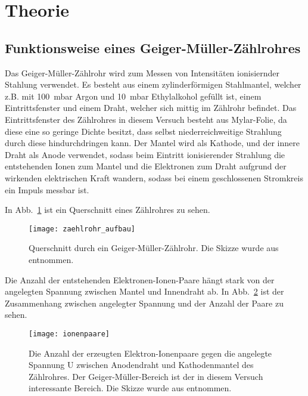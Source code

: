 
\section{Theorie}
\subsection{Funktionsweise eines Geiger-Müller-Zählrohres}
%
Das Geiger-Müller-Zählrohr wird zum Messen von Intensitäten ionisiernder
Stahlung verwendet. Es besteht aus einem zylinderförmigen Stahlmantel,
welcher z.B. mit \SI{100}{\milli\bar} Argon und \SI{10}{\milli\bar}
Ethylalkohol gefüllt ist, einem Eintrittsfenster und einem Draht,
welcher sich mittig im Zählrohr befindet. Das Eintrittsfenster des
Zählrohres in diesem Versuch besteht aus Mylar-Folie, da diese eine so
geringe Dichte besitzt, dass selbst niederreichweitige Strahlung durch
diese hindurchdringen kann.  Der Mantel wird als Kathode, und der innere
Draht als Anode verwendet, sodass beim Eintritt ionisierender Strahlung
die entstehenden Ionen zum Mantel und die Elektronen zum Draht aufgrund
der wirkenden elektrischen Kraft wandern, sodass bei einem geschlossenen
Stromkreis ein Impuls messbar ist.

In Abb.~\ref{fig:zaehlrohr_aufbau} ist ein Querschnitt eines Zählrohres
zu sehen.
%
\begin{figure}[b]
  \centering
  \texttt{[image: zaehlrohr\_aufbau]}
  \caption{Querschnitt durch ein Geiger-Müller-Zählrohr.
               Die Skizze wurde aus \textcite{v703} entnommen.}
  \label{fig:zaehlrohr_aufbau}
\end{figure}
%

Die Anzahl der entstehenden Elektronen-Ionen-Paare hängt stark von der
angelegten Spannung zwischen Mantel und Innendraht ab.  In
Abb.~\ref{fig:ionenpaare} ist der Zusammenhang zwischen angelegter
Spannung und der Anzahl der Paare zu sehen.
%
\begin{figure}
  \centering
  \texttt{[image: ionenpaare]}
  \caption{Die Anzahl der erzeugten Elektron-Ionenpaare gegen die
    angelegte Spannung U zwischen Anodendraht und Kathodenmantel des
    Zählrohres. Der Geiger-Müller-Bereich ist der in diesem Versuch
    interessante Bereich.  Die Skizze wurde aus \textcite{v703}
    entnommen.}
  \label{fig:ionenpaare}
\end{figure}
